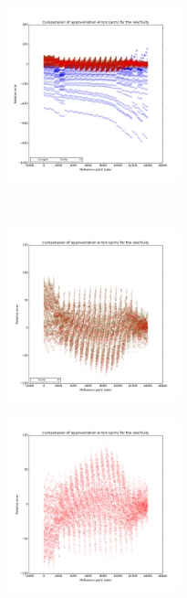 \begin{center}
\begin{figure}[!h]
\begin{subfigure}[b]{0.45\textwidth}
		\end{subfigure}
\end{figure}
\label{figure:results}
\end{center}
\begin{center}
\begin{figure}[!h]\ContinuedFloat
		\centering
		\begin{subfigure}[b]{0.45\textwidth}
				\includegraphics[width=\linewidth,height=5cm]{images/MOX/ReactivityError_with_cocagne.png}
		\end{subfigure}
		~
		\begin{subfigure}[b]{0.45\textwidth}
				\includegraphics[width=\linewidth,height=5cm]{images/MOX/ReactivityError.png}
		\end{subfigure}
		\begin{subfigure}[b]{0.45\textwidth}
				\includegraphics[width=\linewidth,height=5cm]{images/MOX/ReactivityError_alone.png}
		\end{subfigure}
\end{figure}
\label{figure:reactivity}
\end{center}

